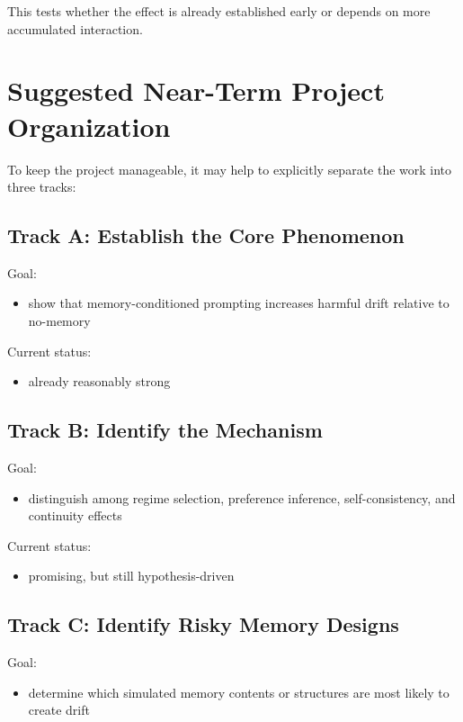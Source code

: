 \documentclass[11pt]{article}
\begin{document}
This tests whether the effect is already established early or depends on more accumulated interaction.

\section{Suggested Near-Term Project Organization}

To keep the project manageable, it may help to explicitly separate the work into three tracks:

\subsection{Track A: Establish the Core Phenomenon}

Goal:

\begin{itemize}
  \item show that memory-conditioned prompting increases harmful drift relative to no-memory
\end{itemize}

Current status:

\begin{itemize}
  \item already reasonably strong
\end{itemize}

\subsection{Track B: Identify the Mechanism}

Goal:

\begin{itemize}
  \item distinguish among regime selection, preference inference, self-consistency, and continuity effects
\end{itemize}

Current status:

\begin{itemize}
  \item promising, but still hypothesis-driven
\end{itemize}

\subsection{Track C: Identify Risky Memory Designs}

Goal:

\begin{itemize}
  \item determine which simulated memory contents or structures are most likely to create drift
\end{itemize}
\end{document}
